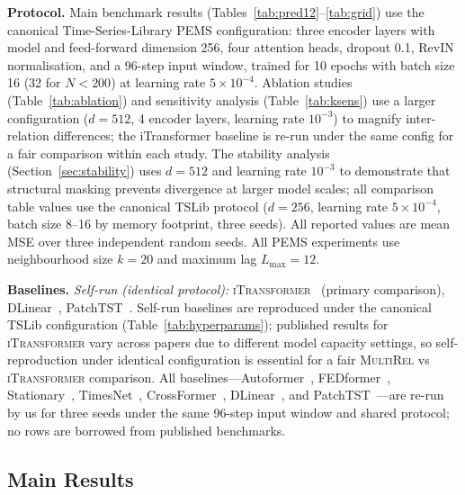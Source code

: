 \documentclass[letterpaper]{article}   %
\newcommand{\mr}{\textsc{MultiRel}}
\newcommand{\itrans}{\textsc{iTransformer}}
\begin{document}
\textbf{Protocol.}
Main benchmark results (Tables~\ref{tab:pred12}--\ref{tab:grid}) use the canonical
Time-Series-Library PEMS configuration: three encoder layers with model and
feed-forward dimension 256, four attention heads, dropout 0.1, RevIN normalisation,
and a 96-step input window, trained for 10 epochs with batch size 16
(32 for $N{<}200$) at learning rate $5{\times}10^{-4}$.
Ablation studies (Table~\ref{tab:ablation}) and sensitivity analysis
(Table~\ref{tab:ksens}) use a larger configuration ($d{=}512$, 4 encoder layers,
learning rate $10^{-3}$) to magnify inter-relation differences; the iTransformer
baseline is re-run under the same config for a fair comparison within each study.
The stability analysis (Section~\ref{sec:stability}) uses $d{=}512$ and
learning rate $10^{-3}$ to demonstrate that structural masking prevents divergence
at larger model scales; all comparison table values use the canonical TSLib protocol
($d{=}256$, learning rate $5{\times}10^{-4}$, batch size 8--16 by memory footprint, three seeds).
All reported values are mean MSE over three independent random seeds.
All PEMS experiments use neighbourhood size $k{=}20$ and maximum lag $L_{\max}{=}12$.

\textbf{Baselines.}
\textit{Self-run (identical protocol):} \itrans{}~\cite{liu2023itransformer}
(primary comparison), DLinear~\cite{zeng2023transformers},
PatchTST~\cite{nie2022time}.
Self-run baselines are reproduced under the canonical TSLib configuration
(Table~\ref{tab:hyperparams}); published results for \itrans{} vary across
papers due to different model capacity settings, so self-reproduction under
identical configuration is essential for a fair \mr{} vs \itrans{} comparison.
All baselines---Autoformer~\cite{wu2021autoformer},
FEDformer~\cite{zhou2022fedformer}, Stationary~\cite{liu2022non},
TimesNet~\cite{wu2023timesnet}, CrossFormer~\cite{zhang2023crossformer},
DLinear~\cite{zeng2023transformers}, and PatchTST~\cite{nie2022time}---are
re-run by us for three seeds under the same 96-step input window and shared
protocol; no rows are borrowed from published benchmarks.

\subsection{Main Results}






\end{document}
